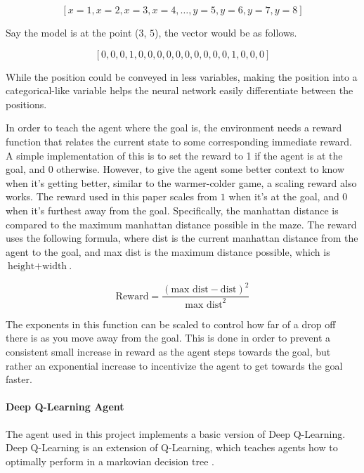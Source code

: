 \documentclass[12pt,letterpaper]{article}
\begin{document}
$$\left [ x = 1 , x = 2 , x = 3 , x = 4 , \hdots , y = 5 , y = 6 , y = 7 , y = 8 \right]$$

Say the model is at the point ($3$, $5$), the vector would be as follows.

$$\left[0,0,0,1,0,0,0,0,0,0,0,0,0,0,1,0,0,0\right]$$

While the position could be conveyed in less variables, making the position into a categorical-like variable helps the neural network easily differentiate between the positions.

In order to teach the agent where the goal is, the environment needs a reward function that relates the current state to some corresponding immediate reward.
A simple implementation of this is to set the reward to 1 if the agent is at the goal, and 0 otherwise.
However, to give the agent some better context to know when it's getting better, similar to the warmer-colder game, a scaling reward also works.
The reward used in this paper scales from $1$ when it's at the goal, and $0$ when it's furthest away from the goal.
Specifically, the manhattan distance is compared to the maximum manhattan distance possible in the maze.
The reward uses the following formula, where dist is the current manhattan distance from the agent to the goal, and max dist is the maximum distance possible, which is $\text{height} + \text{width}$.

$$\text{Reward} = \frac{(\text{max dist} - \text{dist}) ^ 2}{\text{max dist}^2}$$

The exponents in this function can be scaled to control how far of a drop off there is as you move away from the goal.
This is done in order to prevent a consistent small increase in reward as the agent steps towards the goal, but rather an exponential increase to incentivize the agent to get towards the goal faster.

\paragraph{Deep Q-Learning Agent}

The agent used in this project implements a basic version of Deep Q-Learning.
Deep Q-Learning is an extension of Q-Learning, which teaches agents how to optimally perform in a markovian decision tree \cite{article_q_learning}.
\end{document}
